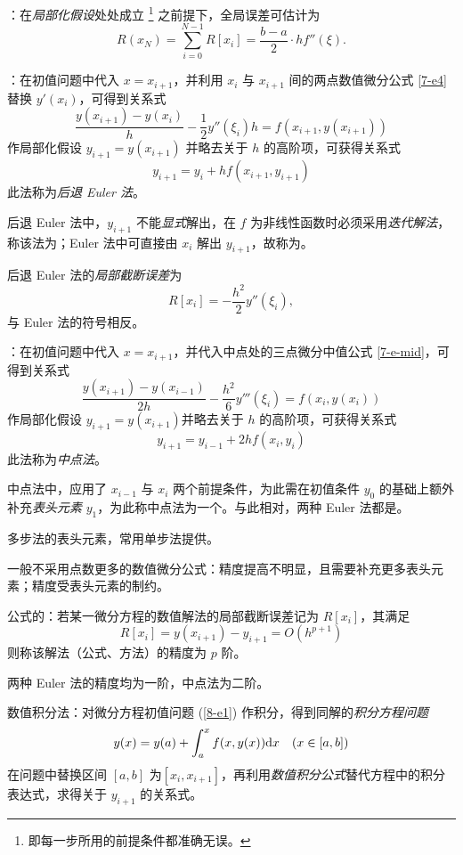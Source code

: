 \entry {}：在\emph{局部化假设}处处成立
\footnote{即每一步所用的前提条件都准确无误。}
之前提下，全局误差可估计为
\begin{equation}
R(x_N)=\sum_{i=0}^{N-1}R[x_i]=\frac{b-a}2\cdot hf''(\xi).
\end{equation}

\entry {}：在初值问题中代入 $x=x_{i+1}$，并利用 $x_i$ 与 $x_{i+1}$ 间的两点数值微分公式 \eqref{7-e4} 替换 $y'(x_i)$，可得到关系式
\[ \frac{y(x_{i+1})-y(x_i)}{h}-\frac12y''(\xi_{i})h=f(x_{i+1},y(x_{i+1})) \]
作局部化假设 $y_{i+1}=y(x_{i+1})$ 并略去关于 $h$ 的高阶项，可获得关系式
\begin{equation}
y_{i+1}=y_i+hf(x_{i+1},y_{i+1})
\end{equation}
此法称为\emph{后退 Euler 法}。

\entry 后退 Euler 法中，$y_{i+1}$ 不能\emph{显式}解出，在 $f$ 为非线性函数时必须采用\emph{迭代解法}，称该法为；Euler 法中可直接由 $x_i$ 解出 $y_{i+1}$，故称为。

\entry 后退 Euler 法的\emph{局部截断误差}为
\begin{equation}
R[x_i]=-\frac{h^2}2y''(\xi_i),
\end{equation}
与 Euler 法的符号相反。

\entry {}：在初值问题中代入 $x=x_{i+1}$，并代入中点处的三点微分中值公式 \eqref{7-e-mid}，可得到关系式
\[ \frac{y(x_{i+1})-y(x_{i-1})}{2h}-\frac{h^2}6y'''(\xi_i)=f(x_i,y(x_i)) \]
作局部化假设 $y_{i+1}=y(x_{i+1})$并略去关于 $h$ 的高阶项，可获得关系式
\begin{equation}
y_{i+1}=y_{i-1}+2hf(x_i,y_i)
\end{equation}
此法称为\emph{中点法}。

\entry 中点法中，应用了 $x_{i-1}$ 与 $x_i$ 两个前提条件，为此需在初值条件 $y_0$ 的基础上额外补充\emph{表头元素} $y_1$，为此称中点法为一个。与此相对，两种 Euler 法都是。

\entry 多步法的表头元素，常用单步法提供。

\entry 一般不采用点数更多的数值微分公式：精度提高不明显，且需要补充更多表头元素；精度受表头元素的制约。

 公式的：若某一微分方程的数值解法的局部截断误差记为 $R[x_i]$，其满足
\[ R[x_i]=y(x_{i+1})-y_{i+1}=O(h^{p+1}) \]
则称该解法（公式、方法）的精度为 $p$ 阶。

\entry 两种 Euler 法的精度均为一阶，中点法为二阶。

\entry 数值积分法：对微分方程初值问题 (\ref{8-e1}) 作积分，得到同解的\emph{积分方程问题}
\begin{equation}
y(x)=y(a)+\int_a^xf(x,y(x))\mathrm{d} x\quad(x\in[a,b])\\
\end{equation}
在问题中替换区间 $[a,b]$ 为$[x_i,x_{i+1}]$，再利用\emph{数值积分公式}替代方程中的积分表达式，求得关于 $y_{i+1}$ 的关系式。


